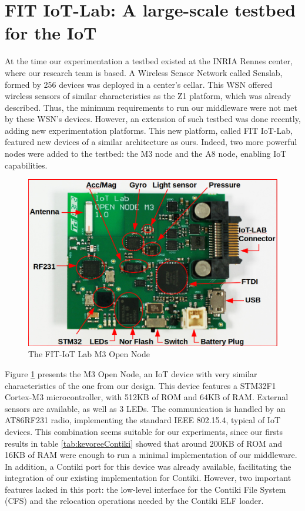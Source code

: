 \section{FIT IoT-Lab: A large-scale testbed for the IoT}
At the time our experimentation a testbed existed at the INRIA Rennes center, where our research team is based.
A Wireless Sensor Network called Senslab\cite{des2011senslab}, formed by 256 devices was deployed in a center's cellar.
This WSN offered wireless sensors of similar characteristics as the Z1 platform, which was already described.
Thus, the minimum requirements to run our middleware were not met by these WSN's devices.
However, an extension of such testbed was done recently, adding new experimentation platforms.
This new platform, called FIT IoT-Lab\cite{Fleury15iotlab}, featured new devices of a similar architecture as ours.
Indeed, two more powerful nodes were added to the testbed: the M3 node and the A8 node, enabling IoT capabilities.

\begin{figure}[htb]
	\centering
	\includegraphics[width=0.7\columnwidth]{chapters/modelsAtRuntimeContiki.images/m3opennode.png}
	\caption{The FIT-IoT Lab M3 Open Node} \label{fig:M3OpenNode}
\end{figure}

Figure \ref{fig:M3OpenNode} presents the M3 Open Node, an IoT device with very similar characteristics of the one from our design.
This device features a STM32F1 Cortex-M3 microcontroller, with 512KB of ROM and 64KB of RAM.
External sensors are available, as well as 3 LEDs.
The communication is handled by an AT86RF231 radio, implementing the standard IEEE 802.15.4, typical of IoT devices.
This combination seems suitable for our experiments, since our firsts results in table \ref{tab:kevoreeContiki} showed that around 200KB of ROM and 16KB of RAM were enough to run a minimal implementation of our middleware.
In addition, a Contiki port for this device was already available, facilitating the integration of our existing implementation for Contiki.
However, two important features lacked in this port: the low-level interface for the Contiki File System (CFS) and the relocation operations needed by the Contiki ELF loader.

